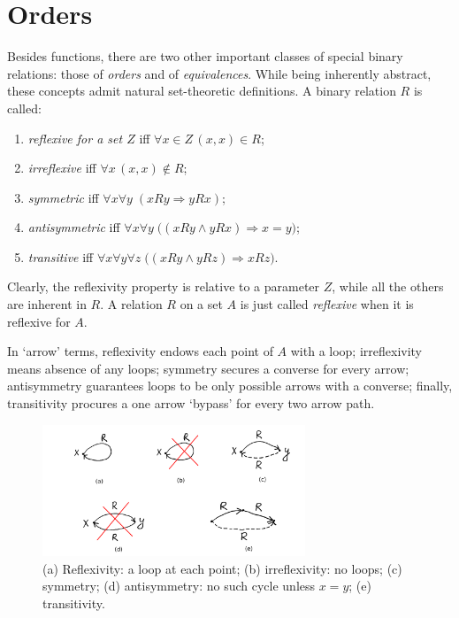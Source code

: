 \documentclass[12pt,notitlepage]{article}
\theoremstyle{plain}
\theoremstyle{definition}
\theoremstyle{plain}
\newcommand{\1}{\mathbf{1}}
\newcommand{\0}{\mathbf{0}}
\newcommand{\ply}{\Longrightarrow}
\newcommand{\mcomm}[1]{}
\begin{document}
\section{Orders}\label{sect:orders}
\mcomm{The two following  sections contain the most common concepts concerning orders, equivalence relations, and partitions. While these topics are abstract, their usefulness for most mathematical courses outweighs the students' likely frustration. To make things more bearable, the Instructor may widely use previous sections as a source of concrete examples and, on the other hand, apply combinatorics to finite orders and equivalences. To attain the latter goal, we count partitions of a finite set and prove Dilworth's Theorem.}


Besides functions, there are two other important classes of special binary relations: those of \emph{orders} and of \emph{equivalences}. While being inherently abstract, these concepts admit natural set-theoretic definitions. A binary relation $R$ is called:
\begin{enumerate}
	\item \emph{reflexive for a set $Z$} iff $\forall x \in Z\, (x,x) \in R$;
	\item \emph{irreflexive} iff $\forall x\, (x,x) \notin R$;
	\item \emph{symmetric} iff $\forall x \forall y\; (x R y \ply y R x)$;
	\item \emph{antisymmetric} iff $\forall x \forall y\; \bigl( (x R y \wedge y R x) \ply x = y \bigr)$;
	\item \emph{transitive} iff $\forall x \forall y \forall z\; \bigl( (x R y \wedge y R z) \ply x R z \bigr)$.
\end{enumerate}
Clearly, the reflexivity property is relative to a parameter $Z$, while all the others are inherent in $R$. A relation $R$ on a set $A$ is just called \emph{reflexive} when it is reflexive for $A$.

In `arrow' terms, reflexivity endows each point of $A$ with a loop; irreflexivity means absence of any loops; symmetry secures a converse for every arrow; antisymmetry guarantees loops to be only possible arrows with a converse; finally, transitivity procures a one arrow `bypass' for every two arrow path.

\begin{figure}[h]
	\centering
	\includegraphics*[width=0.7\textwidth]{ord_refl.pdf}
	\caption{(a) Reflexivity: a loop at each point; (b) irreflexivity: no loops; (c) symmetry; (d) antisymmetry: no such cycle unless $x = y$; (e) transitivity.}
\end{figure}
\end{document}
